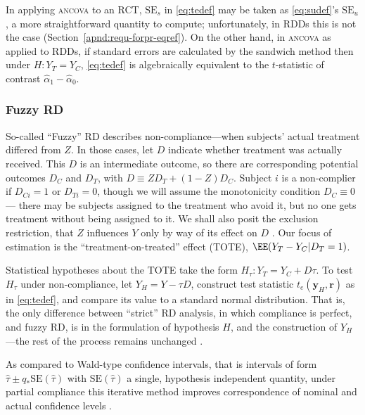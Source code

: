 In applying \textsc{ancova} to an RCT, $\mathrm{SE}_{s}$ in
\eqref{eq:tedef} may be taken as \eqref{eq:sudef}'s
$\mathrm{SE}_{u}$%
, a more straightforward quantity to compute; unfortunately, in RDDs
this is not the case
(Section~\ref{apnd:requ-forpr-eqref}).  On the
other hand, in \textsc{ancova} as applied to RDDs, if standard
errors are calculated by the sandwich method then under
$H: Y_{T} = Y_{C}$, \eqref{eq:tedef} is algebraically equivalent to the
$t$-statistic of contrast $\hat{\alpha}_{1} -\hat{\alpha}_{0}$.

\subsubsection{Fuzzy RD}
So-called ``Fuzzy'' RD describes non-compliance---when subjects' actual
treatment differed from $Z$.
In those cases, let $D$ indicate whether treatment was actually
received.
This $D$ is an intermediate outcome, so there are
corresponding potential outcomes $D_{C}$ and $D_{T}$, with $D \equiv ZD_{T}
+ (1-Z)D_{C}$.
Subject $i$ is a non-complier if $D_{Ci}=1$ or $D_{Ti}=0$, though we
will assume the monotonicity condition $D_{C}\equiv 0$ --- there may be
subjects assigned to the treatment who avoid it, but no one gets
treatment without being assigned to it.
We shall also posit the exclusion restriction,
that $Z$ influences $Y$ only by way of its effect on $D$
\citep{bloom1984ans,Angrist:etal:1996,imbens:rose:2005}.
Our focus of estimation is the
 ``treatment-on-treated'' effect (TOTE),
$\EE(Y_{T} - Y_{C}| D_{T}=1)$.

Statistical hypotheses about the TOTE take the form
$H_\tau:Y_T=Y_C+D\tau$.
To test $H_\tau$ under non-compliance, let $Y_H=Y-\tau D$,
construct test statistic $t_{e} (\mathbf{y}_H,\mathbf{r})$ as in
\eqref{eq:tedef}, and compare its value to a standard normal
distribution.
That is, the only difference between ``strict'' RD analysis, in which
compliance is perfect, and fuzzy RD, is in the formulation of
hypothesis $H$, and the construction of $Y_H$---the rest of the
process remains unchanged \citep{rosenbaum:1996:onAIR}.

As compared to Wald-type
confidence intervals, that is intervals of form $\hat\tau \pm q_{*}
\mathrm{SE}(\hat\tau)$ with $\mathrm{SE}(\hat\tau)$ a single,
hypothesis independent quantity, under partial compliance this iterative method
improves correspondence of nominal and actual confidence levels
\citep[Sec.~7]{imbens:rose:2005,baiocchiChengSmall2014IVtutorial}.

